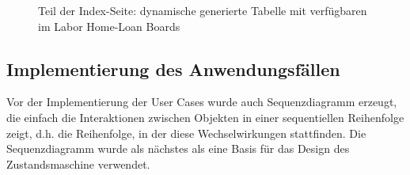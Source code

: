 \begin{figure}
	\centering
	\caption{Teil der Index-Seite: dynamische generierte Tabelle mit verfügbaren im Labor Home-Loan Boards}
	\label{fig:loaned}
\end{figure}

\subsection{Implementierung des Anwendungsfällen}
\label{sec:server:fsm}
Vor der Implementierung der User Cases wurde auch Sequenzdiagramm erzeugt, die einfach die Interaktionen zwischen Objekten in einer sequentiellen Reihenfolge zeigt, d.h. die Reihenfolge, in der diese Wechselwirkungen stattfinden. Die Sequenzdiagramm wurde als nächstes als eine Basis für das Design des Zustandsmaschine verwendet.  

